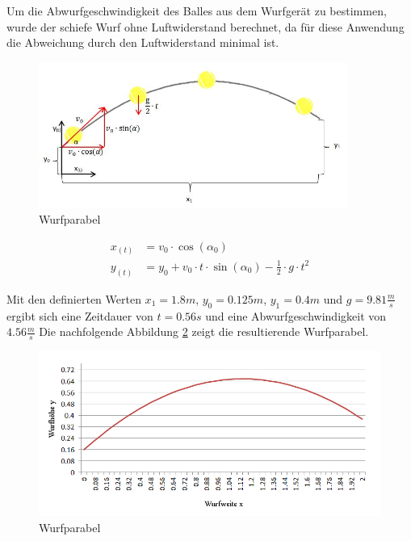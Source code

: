 Um die Abwurfgeschwindigkeit des Balles aus dem Wurfgerät zu bestimmen, wurde der schiefe
Wurf ohne Luftwiderstand berechnet, da für diese Anwendung die Abweichung durch den
Luftwiderstand minimal ist.
\begin{figure}[h!]
	\centering
	\includegraphics[width=0.9\textwidth]{Enddokumentation/Anhang/Bilder/Schiefer_Wurf2.jpg}
	\caption{Wurfparabel}
	\label{fig:Wurfparabel}
\end{figure}
\begin{align}
	x_{(t)} &= v_0 \cdot \cos(\alpha_0)\\
	y_{(t)} &= y_0 + v_0 \cdot t \cdot \sin(\alpha_0) - \frac{1}{2} \cdot g \cdot t^2
\end{align}

Mit den definierten Werten $x_1 = 1.8 m$, $y_0 = 0.125 m$, $y_1 = 0.4 m$ und 
$g = 9.81 \frac{m}{s}$ ergibt sich eine Zeitdauer von $t = 0.56 s$ und eine
Abwurfgeschwindigkeit von $4.56 \frac{m}{s}$ Die nachfolgende Abbildung
\ref{fig:Wurfparabel1} zeigt die resultierende Wurfparabel.
\begin{figure}[h!]
	\centering
	\includegraphics[width=1\textwidth]{Enddokumentation/Anhang/Bilder/Schiefer_Wurf.jpg}
	\caption{Wurfparabel}
	\label{fig:Wurfparabel1}
\end{figure}

